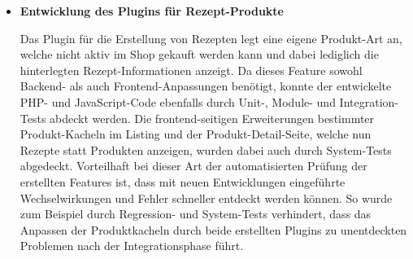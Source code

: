 \begin{itemize}
    \item {
        \textbf{Entwicklung des Plugins für Rezept-Produkte}\par
        Das Plugin für die Erstellung von Rezepten legt eine eigene Produkt-Art an, welche nicht aktiv im Shop gekauft
        werden kann und dabei lediglich die hinterlegten Rezept-Informationen anzeigt.
        Da dieses Feature sowohl Backend- als auch Frontend-Anpassungen benötigt, konnte der entwickelte PHP- und
        JavaScript-Code ebenfalls durch Unit-, Module- und Integration-Tests abdeckt werden.
        Die frontend-seitigen Erweiterungen bestimmter Produkt-Kacheln im Listing und der Produkt-Detail-Seite, welche
        nun Rezepte statt Produkten anzeigen, wurden dabei auch durch System-Tests abgedeckt.
        Vorteilhaft bei dieser Art der automatisierten Prüfung der erstellten Features ist, dass mit neuen
        Entwicklungen eingeführte Wechselwirkungen und Fehler schneller entdeckt werden können.
        So wurde zum Beispiel durch Regression- und System-Tests verhindert, dass das Anpassen der Produktkacheln
        durch beide erstellten Plugins zu unentdeckten Problemen nach der Integrationsphase führt.
    }
\end{itemize}

